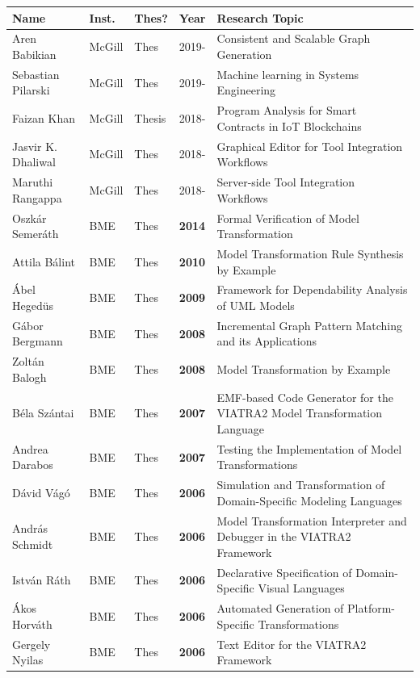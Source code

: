 \documentclass{xetexCV}
\begin{document}
\begin{table}[p]
\begin{tabular}{@{}llllp{9cm}@{}}
\toprule
\textbf{Name} & \textbf{Inst.} & \textbf{Thes?} & \textbf{Year} & \textbf{Research Topic} \\ \midrule
Aren Babikian & McGill & Thes & 2019-   & Consistent and Scalable Graph Generation \\
Sebastian Pilarski & McGill & Thes & 2019- & Machine learning in Systems Engineering \\
Faizan Khan & McGill & Thesis & 2018-   & Program Analysis for Smart Contracts in IoT Blockchains \\
Jasvir K. Dhaliwal & McGill & Thes & 2018-   & Graphical Editor for Tool Integration Workflows \\
Maruthi Rangappa & McGill & Thes & 2018-   & Server-side Tool Integration Workflows \\ \midrule
Oszk\'ar Semer\'ath & BME & Thes & \textbf{2014} & Formal Verification of Model Transformation\\ 
Attila B\'alint & BME & Thes & \textbf{2010} & Model Transformation Rule Synthesis by Example\\ 
\'Abel Heged\"us & BME & Thes & \textbf{2009} & Framework for Dependability Analysis of UML Models\\ 
G\'abor Bergmann & BME & Thes & \textbf{2008} & Incremental Graph Pattern Matching and its Applications\\ 
Zolt\'an Balogh & BME & Thes & \textbf{2008} & Model Transformation by Example\\ 
B\'ela Sz\'antai & BME & Thes & \textbf{2007} & EMF-based Code Generator for the VIATRA2 Model Transformation Language \\ 
Andrea Darabos & BME & Thes & \textbf{2007} & Testing the Implementation of Model Transformations\\ 
D\'avid V\'ag\'o & BME & Thes & \textbf{2006} & Simulation and Transformation of Domain-Specific Modeling Languages\\ 
Andr\'as Schmidt & BME & Thes & \textbf{2006} & Model Transformation Interpreter and Debugger in the VIATRA2 Framework\\ 
Istv\'an R\'ath & BME & Thes & \textbf{2006} & Declarative Specification of Domain-Specific Visual Languages\\ 
\'Akos Horv\'ath & BME & Thes & \textbf{2006} & Automated Generation of Platform-Specific Transformations\\ 
Gergely Nyilas & BME & Thes & \textbf{2006} & Text Editor for the VIATRA2 Framework \\ 

\end{tabular}
\end{table}
\end{document}
